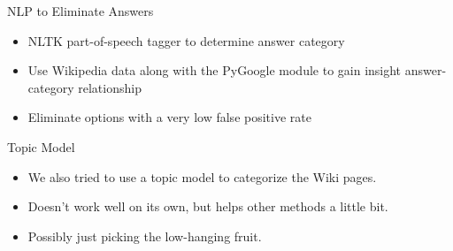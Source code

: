 \documentclass{beamer}
\begin{document}

\begin{frame}{NLP to Eliminate Answers}
   \begin{itemize}
      \item NLTK part-of-speech tagger to determine answer category
      \item Use Wikipedia data along with the PyGoogle module to gain insight answer-category relationship
      \item Eliminate options with a very low false positive rate
   \end{itemize}
\end{frame}



\begin{frame}{Topic Model}
   \begin{itemize}
      \item We also tried to use a topic model to categorize the Wiki pages.
      \item Doesn't work well on its own, but helps other methods a little bit.
      \item Possibly just picking the low-hanging fruit.
   \end{itemize}
\end{frame}

\end{document}
